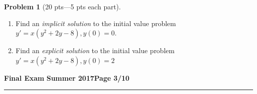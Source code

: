 \documentclass[12pt]{article}
\theoremstyle{definition}
\newtheorem{problem}{Problem}
\begin{document}
\begin{problem}[20 pts---5 pts each part]
\begin{enumerate}
\begin{flushright}
  \end{flushright}
  \item Find an \emph{implicit solution} to the initial value problem $y'=x(y^2+2y-8), y(0)=0$.
  \vspace{5.5cm}
  \begin{flushright}
  \end{flushright}
  \item Find an \emph{explicit solution} to the initial value problem $y'=x(y^2+2y-8), y(0)=2$
  \begin{flushright}
  \end{flushright}
\end{enumerate}
\end{problem} 

\newpage

\hfill{\large\bf Final Exam}\hfill{\large\bf
Summer 2017}\hfill{\large\bf Page 3/10}\hrule
\end{document}
